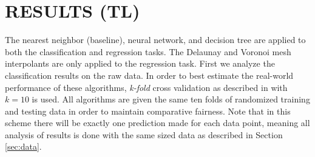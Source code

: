 \documentclass[sigconf]{acmart}
\begin{document}


\section{RESULTS (TL)}
\label{sec:results}

The nearest neighbor (baseline), neural network, and decision tree are applied to both the classification and regression tasks. The Delaunay and Voronoi mesh interpolants are only applied to the regression task. First we analyze the classification results on the raw data. In order to best estimate the real-world performance of these algorithms, \textit{k-fold} cross validation as described in \cite{kohavi1995study} with $k=10$ is used. All algorithms are given the same ten folds of randomized training and testing data in order to maintain comparative fairness. Note that in this scheme there will be exactly one prediction made for each data point, meaning all analysis of results is done with the same sized data as described in Section \ref{sec:data}.
\end{document}
